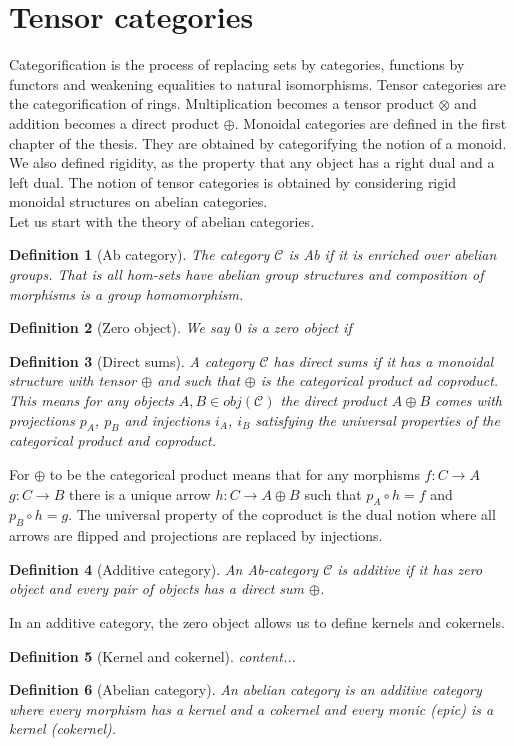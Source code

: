 \documentclass{article}
\newtheorem{definition}{Definition}
\newcommand{\cat}{\mathcal{C}}
\begin{document}
	\section{Tensor categories}
	Categorification is the process of replacing sets by categories, functions by functors and weakening equalities to natural isomorphisms. Tensor categories are the categorification of rings. Multiplication becomes a tensor product $\otimes$ and addition becomes a direct product $\oplus$. Monoidal categories are defined in the first chapter of the thesis. They are obtained by categorifying the notion of a monoid. We also defined rigidity, as the property that any object has a right dual and a left dual. The notion of tensor categories is obtained by considering rigid monoidal structures on abelian categories.\\
	Let us start with the theory of abelian categories.
	\begin{definition}[Ab category]
		The category $\mathcal{C}$ is Ab if it is enriched over abelian groups. That is all hom-sets have abelian group structures and composition of morphisms is a group homomorphism. 
	\end{definition}
	\begin{definition}[Zero object]
		We say $0$ is a zero object if 
	\end{definition}
	\begin{definition}[Direct sums]
	A category $\mathcal{C}$ has direct sums if it has a monoidal structure with tensor $\oplus$ and such that $\oplus$ is the categorical product ad coproduct. This means for any objects $A,B \in obj(\cat)$ the direct product $A\oplus B$ comes with projections $p_A$, $p_B$ and injections $i_A$, $i_B$ satisfying the universal properties of the categorical product and coproduct.
	\end{definition}
	For $\oplus$ to be the categorical product means that for any morphisms $f:C \rightarrow A$ $g: C \rightarrow B$ there is a unique arrow $h: C \rightarrow A \oplus B$ such that $p_A\circ h = f$ and $p_B \circ h =g$. The universal property of the coproduct is the dual notion where all arrows are flipped and projections are replaced by injections.
	\begin{definition}[Additive category]
		An Ab-category $\mathcal{C}$ is additive if it has zero object and every pair of objects has a direct sum $\oplus$.
	\end{definition}
	In an additive category, the zero object allows us to define kernels and cokernels.
	\begin{definition}[Kernel and cokernel]
		content...
	\end{definition}
	\begin{definition}[Abelian category]
		An abelian category is an additive category where every morphism has a kernel and a cokernel and every monic (epic) is a kernel (cokernel).
	\end{definition} 
\end{document}
